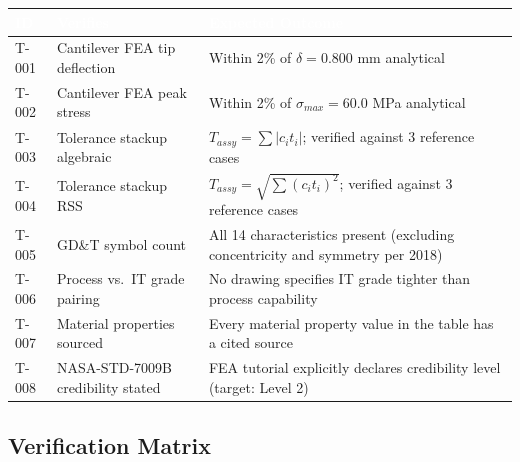 \documentclass[11pt,letterpaper]{article}
\newcommand{\tableheader}[1]{\textbf{\sffamily\textcolor{white}{#1}}}
\begin{document}
\begin{center}
\begin{tabularx}{\textwidth}{C{1.2cm}L{4cm}X}
\toprule
{}
\tableheader{ID} & \tableheader{Verifies} & \tableheader{Expected Outcome} \\
\midrule
T-001 & Cantilever FEA tip deflection & Within 2\% of $\delta = 0.800$ mm analytical \\
T-002 & Cantilever FEA peak stress & Within 2\% of $\sigma_{max} = 60.0$ MPa analytical \\
T-003 & Tolerance stackup algebraic & $T_{assy} = \sum |c_i t_i|$; verified against 3 reference cases \\
T-004 & Tolerance stackup RSS & $T_{assy} = \sqrt{\sum (c_i t_i)^2}$; verified against 3 reference cases \\
T-005 & GD\&T symbol count & All 14 characteristics present (excluding concentricity and symmetry per 2018) \\
T-006 & Process vs.\ IT grade pairing & No drawing specifies IT grade tighter than process capability \\
T-007 & Material properties sourced & Every material property value in the table has a cited source \\
T-008 & NASA-STD-7009B credibility stated & FEA tutorial explicitly declares credibility level (target: Level 2) \\
\bottomrule
\end{tabularx}
\end{center}

\subsection{Verification Matrix}
\end{document}
